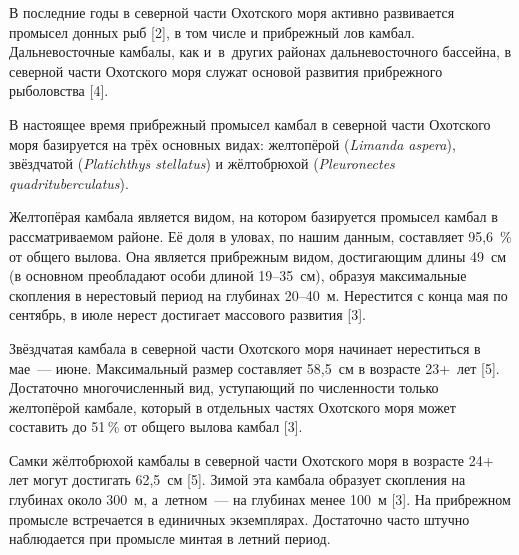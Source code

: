 



\makeProcTitleIVRazdel
{}



В последние годы в северной части Охотского моря активно развивается промысел донных рыб [2], в том числе и прибрежный лов камбал. Дальневосточные камбалы, как и~в~других районах дальневосточного бассейна, в северной части Охотского моря служат основой развития прибрежного рыболовства [4].

В настоящее время прибрежный промысел камбал в северной части Охотского моря базируется на трёх основных видах: желтопёрой (\textit{Limanda aspera}), звёздчатой (\textit{Platichthys stellatus}) и жёлтобрюхой (\textit{Pleuronectes quad\-ri\-tu\-ber\-culatus}).

Желтопёрая камбала является видом, на котором базируется промысел камбал в рассматриваемом районе. Её доля в уловах, по нашим данным, составляет 95,6~\% от общего вылова. Она является прибрежным видом, достигающим длины 49~см (в основном преобладают особи длиной 19--35~см), образуя максимальные скопления в нерестовый период на глубинах 20--40~м. Нерестится с конца мая по сентябрь, в июле нерест достигает массового развития [3].

Звёздчатая камбала в северной части Охотского моря начинает нереститься в мае~--- июне. Максимальный размер составляет 58,5~см в возрасте 23+~лет [5]. Достаточно многочисленный вид, уступающий по численности только желтопёрой камбале, который в отдельных частях Охотского моря может составить до 51\,\% от общего вылова камбал [3].

Самки жёлтобрюхой камбалы в северной части Охотского моря в возрасте 24+ лет могут достигать 62,5~см [5]. Зимой эта камбала образует скопления на глубинах около 300~м, а~летном~--- на глубинах менее 100~м [3]. На прибрежном промысле встречается в единичных экземплярах. Достаточно часто штучно наблюдается при промысле минтая в летний период.

